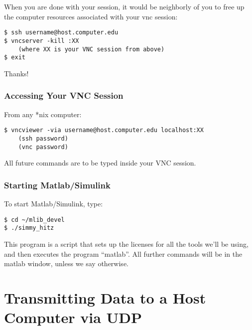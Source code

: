 \documentclass[11pt]{article}
\begin{document}
When you are done with your session, it would be neighborly of you to free up the computer resources associated with your vnc session:
\begin{verbatim}
$ ssh username@host.computer.edu
$ vncserver -kill :XX
    (where XX is your VNC session from above)
$ exit
\end{verbatim}
Thanks!

\subsubsection*{Accessing Your VNC Session}

From any *nix computer:
\begin{verbatim}
$ vncviewer -via username@host.computer.edu localhost:XX
    (ssh password)
    (vnc password)
\end{verbatim}

All future commands are to be typed inside your VNC session.

%

\subsubsection*{Starting Matlab/Simulink}

To start Matlab/Simulink, type:

\begin{verbatim}
$ cd ~/mlib_devel
$ ./simmy_hitz
\end{verbatim}

This program is a script that sets up the licenses for all the tools we'll be
using, and then executes the program ``matlab''.  All further commands will be in
the matlab window, unless we say otherwise.

\section{Transmitting Data to a Host Computer via UDP}
\end{document}
